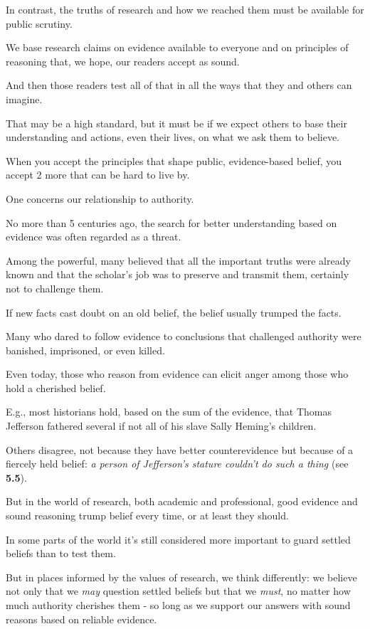 \documentclass[oneside]{book}
\numberwithin{equation}{section}
\begin{document}
%
In contrast, the truths of research and how we reached them must be available for public scrutiny.

We base research claims on evidence available to everyone and on principles of reasoning that, we hope, our readers accept as sound.

And then those readers test all of that in all the ways that they and others can imagine.

That may be a high standard, but it must be if we expect others to base their understanding and actions, even their lives, on what we ask them to believe.

%
When you accept the principles that shape public, evidence-based belief, you accept 2 more that can be hard to live by.

One concerns our relationship to authority.

No more than 5 centuries ago, the search for better understanding based on evidence was often regarded as a threat.

Among the powerful, many believed that all the important truths were already known and that the scholar's job was to preserve and transmit them, certainly not to challenge them.

If new facts cast doubt on an old belief, the belief usually trumped the facts.

Many who dared to follow evidence to conclusions that challenged authority were banished, imprisoned, or even killed.

%
Even today, those who reason from evidence can elicit anger among those who hold a cherished belief.

E.g., most historians hold, based on the sum of the evidence, that Thomas Jefferson fathered several if not all of his slave Sally Heming's children.

Others disagree, not because they have better counterevidence but because of a fiercely held belief: \textit{a person of Jefferson's stature couldn't do such a thing} (see \textbf{5.5}).

But in the world of research, both academic and professional, good evidence and sound reasoning trump belief every time, or at least they should.

%
In some parts of the world it's still considered more important to guard settled beliefs than to test them.

But in places informed by the values of research, we think differently: we believe not only that we \textit{may} question settled beliefs but that we \textit{must}, no matter how much authority cherishes them - so long as we support our answers with sound reasons based on reliable evidence.
\end{document}
